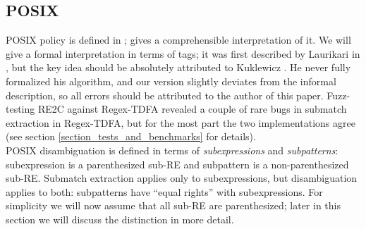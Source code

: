 \documentclass{article}
\theoremstyle{definition}
\begin{document}
\begin{multicols}{2}
\subsection*{POSIX}

POSIX policy is defined in \cite{POSIX}; \cite{Fow03} gives a comprehensible interpretation of it.
We will give a formal interpretation in terms of tags;
it was first described by Laurikari in \cite{Lau01}, but the key idea should be absolutely attributed to Kuklewicz \cite{Kuk07}.
He never fully formalized his algorithm, and our version slightly deviates from the informal description,
so all errors should be attributed to the author of this paper.
Fuzz-testing RE2C against Regex-TDFA revealed a couple of rare bugs in submatch extraction in Regex-TDFA,
but for the most part the two implementations agree
(see section \ref{section_tests_and_benchmarks} for details).
\\

POSIX disambiguation is defined in terms of \emph{subexpressions} and \emph{subpatterns}:
subexpression is a parenthesized sub-RE and subpattern is a non-parenthesized sub-RE.
Submatch extraction applies only to subexpressions, but disambiguation applies to both:
subpatterns have ``equal rights'' with subexpressions.
For simplicity we will now assume that all sub-RE are parenthesized;
later in this section we will discuss the distinction in more detail.
\\


\end{multicols}
\end{document}
